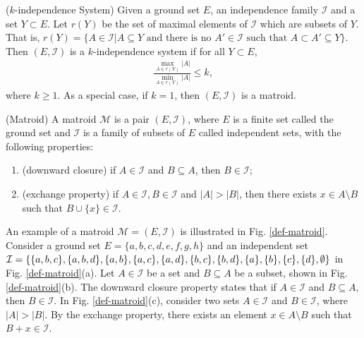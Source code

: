 \begin{definition} \label{def:k-independence-system} ($k$-independence System) \cite{korte1978analysis}
Given a ground set $E$, an independence family $\mathcal{I}$ and a set $Y\subset E$. Let $r(Y)$ be the set of maximal elements of $\mathcal{I}$ which are subsets of $Y$. That is, $r(Y)=\{A \in \mathcal{I} | A\subseteq Y \text{ and there is no }A' \in \mathcal{I} \text{ such that } A\subset A' \subseteq Y \}$. Then $(E, \mathcal{I})$ is a $k$-independence system if for all $Y\subset E$,
\begin{align*}
    \frac{\max_{A\in r(Y)}|A|}{\min_{A\in r(Y)}|A|} \leq k,
\end{align*}
where $k\geq1$. As a special case, if $k=1$, then $(E, \mathcal{I})$ is a matroid. \\
\end{definition}

\begin{definition} \label{def:matroid} (Matroid) \cite{nemhauser1978analysis}
A matroid $\mathcal{M}$ is a pair $(E, \mathcal{I})$, where $E$ is a finite set called the ground set and $\mathcal{I}$ is a family of subsets of $E$ called independent sets, with the following properties:
\begin{enumerate}
    \item (downward closure) if $A\in \mathcal{I}$ and $B \subseteq A$, then $B \in \mathcal{I}$;
    \item (exchange property) if $A \in \mathcal{I}, B\in \mathcal{I}$ and $|A|>|B|$, then there exists $x \in A\setminus B$ such that $B \cup \{x\} \in \mathcal{I}$.\\
\end{enumerate}
\end{definition}

An example of a matroid $\mathcal{M}=(E, \mathcal{I})$ is illustrated in Fig. \ref{def-matroid}.
Consider a ground set $E=\{a,b,c,d,e,f,g,h\}$ and an independent set $\mathcal{I}=\{\{a,b,c\}, \{a,b,d\}, \{a,b\}, \{a,c\}, \{a,d\}, \{b,c\}, \{b,d\}, \{a\}, \\ \{b\}, \{c\}, \{d\}, \emptyset \}$ in Fig. \ref{def-matroid}(a).
Let $A \in \mathcal{I}$ be a set and $B \subseteq A$ be a subset, shown in Fig. \ref{def-matroid}(b). The downward closure property states that if $A\in \mathcal{I}$ and $B \subseteq A$, then $B \in \mathcal{I}$. In Fig. \ref{def-matroid}(c), consider two sets $A \in \mathcal{I}$ and $B \in \mathcal{I}$, where $|A|>|B|$. By the exchange property, there exists an element $x \in A\setminus B$ such that $B+x \in \mathcal{I}$.\\

